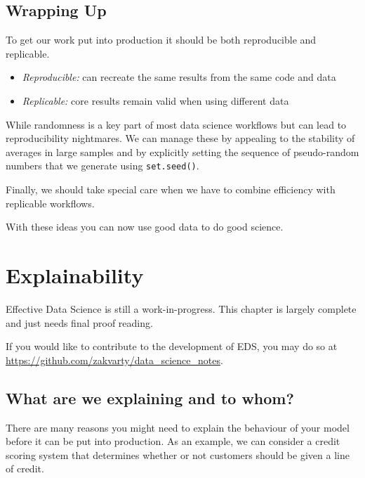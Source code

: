 \documentclass[
  12pt,
]{book}
\begin{document}
\hypertarget{wrapping-up-5}{%
\section{Wrapping Up}\label{wrapping-up-5}}

To get our work put into production it should be both reproducible and replicable.

\begin{itemize}
\item
  \emph{Reproducible:} can recreate the same results from the same code and data
\item
  \emph{Replicable:} core results remain valid when using different data
\end{itemize}

While randomness is a key part of most data science workflows but can lead to reproducibility nightmares. We can manage these by appealing to the stability of averages in large samples and by explicitly setting the sequence of pseudo-random numbers that we generate using \texttt{set.seed()}.

Finally, we should take special care when we have to combine efficiency with replicable workflows.

With these ideas you can now use good data to do good science.

\hypertarget{production-explainability}{%
\chapter{Explainability}\label{production-explainability}}

Effective Data Science is still a work-in-progress. This chapter is largely complete and just needs final proof reading.

If you would like to contribute to the development of EDS, you may do so at \url{https://github.com/zakvarty/data_science_notes}.

\hypertarget{what-are-we-explaining-and-to-whom}{%
\section{What are we explaining and to whom?}\label{what-are-we-explaining-and-to-whom}}

There are many reasons you might need to explain the behaviour of your model before it can be put into production. As an example, we can consider a credit scoring system that determines whether or not customers should be given a line of credit.
\end{document}
